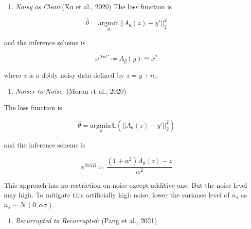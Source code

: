 \documentclass[
]{agujournal2019}
\providecommand{\tightlist}{%
  \setlength{\itemsep}{0pt}\setlength{\parskip}{0pt}}\usepackage{longtable,booktabs,array}
\begin{document}
\begin{enumerate}
\def\labelenumi{\arabic{enumi}.}
\setcounter{enumi}{1}
\tightlist
\item
  \emph{Noisy as Clean}:(Xu et al., 2020) The loss function is
\end{enumerate}

\[ \hat{\theta}=\underset{\theta}{\mathrm{argmin}}\, ||A_\theta (z)-y'||^2_2\]

and the inference scheme is

\[x^{NaC}\coloneqq A_{\hat{\theta}}(y)\simeq x^*\]

where \(z\) is a dobly noisy data defined by \(z=y+n_s\).

\begin{enumerate}
\def\labelenumi{\arabic{enumi}.}
\setcounter{enumi}{2}
\tightlist
\item
  \emph{Noiser to Noise}: (Moran et al., 2020)
\end{enumerate}

The loss function is

\[ \hat{\theta}=\underset{\theta}{\mathrm{argmin}}\,\mathbb{E} \left(||A_\theta (z)-y'||^2_2\right)\]

and the inference scheme is

\[x^{Nr2R}\coloneqq \frac{(1+\alpha^2)A_\theta(z)-z}{\alpha^2}\]

\begin{tcolorbox}[enhanced jigsaw, breakable, leftrule=.75mm, toprule=.15mm, bottomtitle=1mm, coltitle=black, bottomrule=.15mm, colbacktitle=quarto-callout-note-color!10!white, opacityback=0, toptitle=1mm, left=2mm, titlerule=0mm, title=\textcolor{quarto-callout-note-color}{\faInfo}\hspace{0.5em}{Note}, colback=white, arc=.35mm, rightrule=.15mm, colframe=quarto-callout-note-color-frame, opacitybacktitle=0.6]

This approach has no restriction on noise except additive one. But the
noise level may high. To mitigate this artificially high noise, lower
the variance level of \(n_s\) as
\(n_s\sim \mathcal{N}(0,\alpha\sigma)\).

\end{tcolorbox}

\begin{enumerate}
\def\labelenumi{\arabic{enumi}.}
\setcounter{enumi}{3}
\tightlist
\item
  \emph{Recurrupted to Recurrupted}: (Pang et al., 2021)
\end{enumerate}
\end{document}
